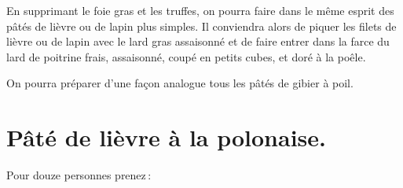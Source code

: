 \sk

En supprimant le foie gras et les truffes, on pourra faire dans le même esprit
des pâtés de lièvre ou de lapin plus simples. Il conviendra alors de piquer les
filets de lièvre ou de lapin avec le lard gras assaisonné et de faire entrer
dans la farce du lard de poitrine frais, assaisonné, coupé en petits cubes, et
doré à la poêle.

\sk

On pourra préparer d'une façon analogue tous les pâtés de gibier à poil.

\section*{\centering Pâté de lièvre à la polonaise.}
{}

Pour douze personnes prenez :

